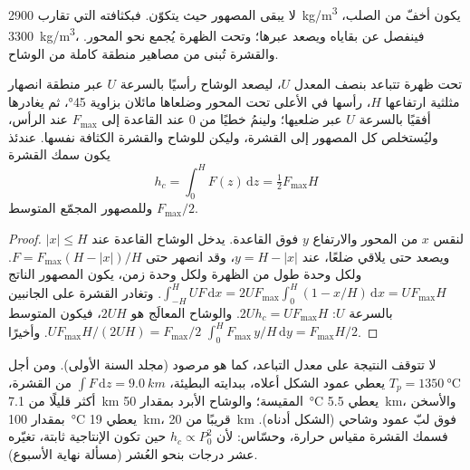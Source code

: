 لا يبقى المصهور حيث يتكوّن. فبكثافته التي تقارب \qty{2900}{kg/m^3} يكون
أخفّ من  الصلب، \qty{3300}{kg/m^3}، فينفصل عن
بقاياه ويصعد عبرها؛ وتحت الظهرة يُجمع نحو المحور.
والقشرة تُبنى من مصاهير منطقة كاملة من الوشاح.

\begin{proposition}\label{prop:b2:mantle-melting:triangle}
تحت ظهرة تتباعد بنصف المعدل $U$، ليصعد الوشاح رأسيًا
بالسرعة $U$ عبر منطقة انصهار مثلثية ارتفاعها $H$، رأسها في الأعلى
تحت المحور وضلعاها مائلان بزاوية \ang{45}، ثم يغادرها أفقيًا بالسرعة $U$
عبر ضلعيها؛ ولينمُ  خطيًا من $0$ عند القاعدة إلى
$F_{\max}$ عند الرأس، وليُستخلص كل المصهور إلى القشرة، وليكن للوشاح
والقشرة الكثافة نفسها. عندئذ يكون سمك القشرة
\[
  h_c = \int_0^H F(z)\,\mathrm dz = \tfrac12 F_{\max}H
\]
وللمصهور المجمّع  المتوسط $F_{\max}/2$.
\end{proposition}

\begin{proof}
لنقس $x$ من المحور والارتفاع $y$ فوق القاعدة. يدخل الوشاح القاعدة
عند $|x| \le H$ ويصعد حتى يلاقي ضلعًا، عند $y = H - |x|$، وقد انصهر حتى
$F = F_{\max}(H - |x|)/H$. ولكل وحدة طول من الظهرة ولكل وحدة زمن، يكون المصهور الناتج
$\int_{-H}^{H} U F\,\mathrm dx = 2UF_{\max}\int_0^H (1 - x/H)\,\mathrm dx =
UF_{\max}H$. وتغادر القشرة على الجانبين بالسرعة $U$: $2Uh_c = UF_{\max}H$.
والوشاح المعالَج هو $2UH$، فيكون  المتوسط $UF_{\max}H/(2UH) =
F_{\max}/2$. وأخيرًا $\int_0^H F_{\max}\,y/H\,\mathrm dy = F_{\max}H/2$.
\end{proof}

لا تتوقف النتيجة على معدل التباعد، كما هو مرصود (مجلد السنة
الأولى). ومن أجل $T_p = \qty{1350}{\celsius}$ يعطي عمود الشكل أعلاه، ببدايته
البطيئة، $\int F\,\mathrm dz = \qty{9.0}{km}$ من القشرة، أكثر قليلًا
من \qty{7.1}{km} المقيسة؛ والوشاح الأبرد بمقدار \qty{50}{\celsius} يعطي
\qty{5.5}{km}، والأسخن بمقدار \qty{100}{\celsius} يعطي \qty{19}{km}، قريبًا من
\qty{20}{km} فوق لبّ عمود وشاحي (الشكل أدناه). فسمك القشرة
مقياس حرارة، وحسّاس: لأن $h_c \propto P_0^2$ حين تكون الإنتاجية
ثابتة، تغيّره عشر درجات بنحو العُشر (مسألة نهاية الأسبوع).

